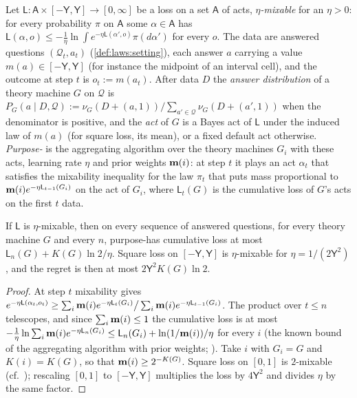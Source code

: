 \begin{definition}\label{def:laws:purposesai}
Let $\mathsf L:\mathsf A\times[-\mathsf Y,\mathsf Y]\to[0,\infty]$ be a loss on a set $\mathsf A$ of acts, \emph{$\eta$-mixable} for an $\eta>0$: for every probability $\pi$ on $\mathsf A$ some $\alpha\in\mathsf A$ has $\mathsf L(\alpha,o)\le-\frac1\eta\ln\int e^{-\eta\mathsf L(\alpha',o)}\pi(d\alpha')$ for every $o$. The data are answered questions $(\mathcal Q_t,a_t)$ (\cref{def:laws:setting}), each answer $a$ carrying a value $m(a)\in[-\mathsf Y,\mathsf Y]$ (for instance the midpoint of an interval cell), and the outcome at step $t$ is $o_t:=m(a_t)$. After data $D$ the \emph{answer distribution} of a theory machine $G$ on $\mathcal Q$ is $P_G(a\mid D,\mathcal Q):=\nu_G(D+(a,1))/\sum_{a'\in\mathcal Q}\nu_G(D+(a',1))$ when the denominator is positive, and the \emph{act} of $G$ is a Bayes act of $\mathsf L$ under the induced law of $m(a)$ (for square loss, its mean), or a fixed default act otherwise. \emph{Purpose-\SAIabbr} is the aggregating algorithm \citep{vovk1990aggregating,vovk2001competitive} over the theory machines $G_i$ with these acts, learning rate $\eta$ and prior weights $\mathbf{m}(i)$: at step $t$ it plays an act $\alpha_t$ that satisfies the mixability inequality for the law $\pi_t$ that puts mass proportional to $\mathbf{m}(i)e^{-\eta\mathsf L_{t-1}(G_i)}$ on the act of $G_i$, where $\mathsf L_t(G)$ is the cumulative loss of $G$'s acts on the first $t$ data.
\end{definition}

\begin{proposition}\label{prop:laws:purposeregret}
If $\mathsf L$ is $\eta$-mixable, then on every sequence of answered questions, for every theory machine $G$ and every $n$, purpose-\SAIabbr has cumulative loss at most $\mathsf L_n(G)+K(G)\ln2/\eta$. Square loss on $[-\mathsf Y,\mathsf Y]$ is $\eta$-mixable for $\eta=1/(2\mathsf Y^2)$, and the regret is then at most $2\mathsf Y^2K(G)\ln2$.
\end{proposition}

\begin{proof}
At step $t$ mixability gives $e^{-\eta\mathsf L(\alpha_t,o_t)}\ge\sum_i\mathbf{m}(i)e^{-\eta\mathsf L_t(G_i)}\big/\sum_i\mathbf{m}(i)e^{-\eta\mathsf L_{t-1}(G_i)}$. The product over $t\le n$ telescopes, and since $\sum_i\mathbf{m}(i)\le1$ the cumulative loss is at most $-\frac1\eta\ln\sum_i\mathbf{m}(i)e^{-\eta\mathsf L_n(G_i)}\le\mathsf L_n(G_i)+\ln(1/\mathbf{m}(i))/\eta$ for every $i$ (the known bound of the aggregating algorithm with prior weights; \citealp{vovk2001competitive}). Take $i$ with $G_i=G$ and $K(i)=K(G)$, so that $\mathbf{m}(i)\ge2^{-K(G)}$. Square loss on $[0,1]$ is $2$-mixable (cf.\ \citealp{haussler1998sequential}); rescaling $[0,1]$ to $[-\mathsf Y,\mathsf Y]$ multiplies the loss by $4\mathsf Y^2$ and divides $\eta$ by the same factor.
\end{proof}


